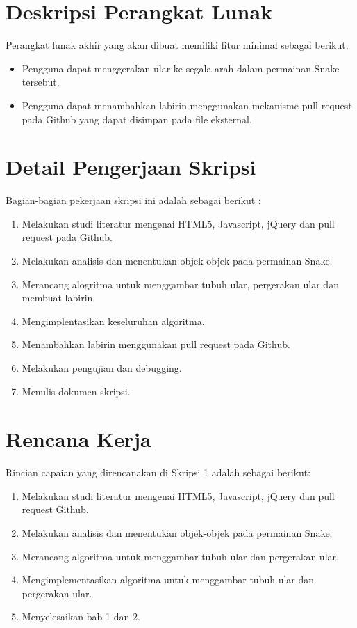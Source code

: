 \documentclass[a4paper,twoside]{article}
\begin{document}
\section{Deskripsi Perangkat Lunak}
Perangkat lunak akhir yang akan dibuat memiliki fitur minimal sebagai berikut:
\begin{itemize}
	\item Pengguna dapat menggerakan ular ke segala arah dalam permainan Snake tersebut. 
	\item Pengguna dapat menambahkan labirin menggunakan mekanisme pull request pada Github yang dapat disimpan pada file eksternal.
\end{itemize}

\section{Detail Pengerjaan Skripsi}
Bagian-bagian pekerjaan skripsi ini adalah sebagai berikut :
	\begin{enumerate}
		\item Melakukan studi literatur mengenai HTML5, Javascript, jQuery dan pull request pada Github.
		\item Melakukan analisis dan menentukan objek-objek pada permainan Snake.
		\item Merancang alogritma untuk menggambar tubuh ular, pergerakan ular dan membuat labirin.
		\item Mengimplentasikan keseluruhan algoritma.
		\item Menambahkan labirin menggunakan pull request pada Github.
		\item Melakukan pengujian dan debugging.
		\item Menulis dokumen skripsi.
	\end{enumerate}

\section{Rencana Kerja}
Rincian capaian yang direncanakan di Skripsi 1 adalah sebagai berikut:
\begin{enumerate}
\item Melakukan studi literatur mengenai HTML5, Javascript, jQuery dan pull request Github.
\item Melakukan analisis dan menentukan objek-objek pada permainan Snake.
\item Merancang algoritma untuk menggambar tubuh ular dan pergerakan ular.
\item Mengimplementasikan algoritma untuk menggambar tubuh ular dan pergerakan ular.
\item Menyelesaikan bab 1 dan 2.
\end{enumerate}
\end{document}
